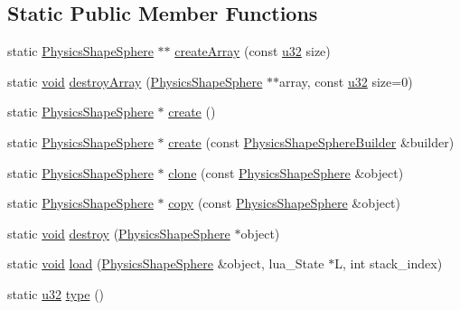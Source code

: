 \subsection*{Static Public Member Functions}
\begin{DoxyCompactItemize}
\item 
static \mbox{\hyperlink{classnjli_1_1_physics_shape_sphere}{Physics\+Shape\+Sphere}} $\ast$$\ast$ \mbox{\hyperlink{classnjli_1_1_physics_shape_sphere_aa7044286a73f1dba93773bdc3d1ccc81}{create\+Array}} (const \mbox{\hyperlink{_util_8h_a10e94b422ef0c20dcdec20d31a1f5049}{u32}} size)
\item 
static \mbox{\hyperlink{_thread_8h_af1e856da2e658414cb2456cb6f7ebc66}{void}} \mbox{\hyperlink{classnjli_1_1_physics_shape_sphere_a2913ff7eb4b1a576cc0e0b832eab0eeb}{destroy\+Array}} (\mbox{\hyperlink{classnjli_1_1_physics_shape_sphere}{Physics\+Shape\+Sphere}} $\ast$$\ast$array, const \mbox{\hyperlink{_util_8h_a10e94b422ef0c20dcdec20d31a1f5049}{u32}} size=0)
\item 
static \mbox{\hyperlink{classnjli_1_1_physics_shape_sphere}{Physics\+Shape\+Sphere}} $\ast$ \mbox{\hyperlink{classnjli_1_1_physics_shape_sphere_a6ba1d3aef468411deee1b0525d5510b5}{create}} ()
\item 
static \mbox{\hyperlink{classnjli_1_1_physics_shape_sphere}{Physics\+Shape\+Sphere}} $\ast$ \mbox{\hyperlink{classnjli_1_1_physics_shape_sphere_ac0cc733b465cf06dc04f6d9949de2c1c}{create}} (const \mbox{\hyperlink{classnjli_1_1_physics_shape_sphere_builder}{Physics\+Shape\+Sphere\+Builder}} \&builder)
\item 
static \mbox{\hyperlink{classnjli_1_1_physics_shape_sphere}{Physics\+Shape\+Sphere}} $\ast$ \mbox{\hyperlink{classnjli_1_1_physics_shape_sphere_a62800c61cc69cab1aa03734fdf0090c6}{clone}} (const \mbox{\hyperlink{classnjli_1_1_physics_shape_sphere}{Physics\+Shape\+Sphere}} \&object)
\item 
static \mbox{\hyperlink{classnjli_1_1_physics_shape_sphere}{Physics\+Shape\+Sphere}} $\ast$ \mbox{\hyperlink{classnjli_1_1_physics_shape_sphere_a36401d4b67bd40ef1694325cb7ca07aa}{copy}} (const \mbox{\hyperlink{classnjli_1_1_physics_shape_sphere}{Physics\+Shape\+Sphere}} \&object)
\item 
static \mbox{\hyperlink{_thread_8h_af1e856da2e658414cb2456cb6f7ebc66}{void}} \mbox{\hyperlink{classnjli_1_1_physics_shape_sphere_af539bed7a0cb19660a3e7993e8777543}{destroy}} (\mbox{\hyperlink{classnjli_1_1_physics_shape_sphere}{Physics\+Shape\+Sphere}} $\ast$object)
\item 
static \mbox{\hyperlink{_thread_8h_af1e856da2e658414cb2456cb6f7ebc66}{void}} \mbox{\hyperlink{classnjli_1_1_physics_shape_sphere_a9208b4f02344bc95dc5090d0f2fb17fa}{load}} (\mbox{\hyperlink{classnjli_1_1_physics_shape_sphere}{Physics\+Shape\+Sphere}} \&object, lua\+\_\+\+State $\ast$L, int stack\+\_\+index)
\item 
static \mbox{\hyperlink{_util_8h_a10e94b422ef0c20dcdec20d31a1f5049}{u32}} \mbox{\hyperlink{classnjli_1_1_physics_shape_sphere_abb7e873d046cf4470ac7c9b5242d8088}{type}} ()
\end{DoxyCompactItemize}
